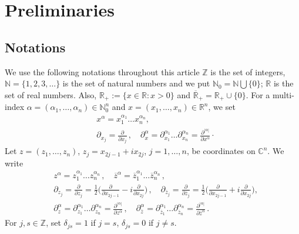 \documentclass[12pt]{amsart}
\theoremstyle{definition}
\theoremstyle{named}
\numberwithin{equation}{subsection}
\newcommand{\ol}{\overline}
\newcommand{\R}{\mathbb{R}}
\newcommand{\C}{\mathbb{C}}
\newcommand{\N}{\mathbb{N}}
\begin{document}
\section{Preliminaries}\label{s-gue241119yyd}
\subsection{Notations}
We use the following notations throughout this article 
$\mathbb{Z}$ is the set of integers, 
$\N=\{1,2,3,\ldots\}$ is the set of natural numbers and we 
put $\N_0=\N\bigcup\{0\}$; $\mathbb R$ is the set of
real numbers. Also, $\R_+:=\{x\in\R:x>0\}$ and 
$\overline{\mathbb R}_+=\R_+\cup\{0\}$.
For a multi-index $\alpha=(\alpha_1,\ldots,\alpha_n)\in\N^n_0$ 
and $x=(x_1,\ldots,x_n)\in\mathbb R^n$, we set
\begin{equation}
\begin{split}
&x^\alpha=x_1^{\alpha_1}\ldots x^{\alpha_n}_n,\\
& \partial_{x_j}=\frac{\partial}{\partial x_j}\,,\quad
\partial^\alpha_x=\partial^{\alpha_1}_{x_1}\ldots\partial^{\alpha_n}_{x_n}
=\frac{\partial^{|\alpha|}}{\partial x^\alpha}\cdot
\end{split}
\end{equation}
Let $z=(z_1,\ldots,z_n)$, $z_j=x_{2j-1}+ix_{2j}$, $j=1,\ldots,n$, 
be coordinates on $\C^n$. We write
\begin{equation}
\begin{split}
&z^\alpha=z_1^{\alpha_1}\ldots z^{\alpha_n}_n\,,
\quad\ol z^\alpha=\ol z_1^{\alpha_1}\ldots\ol z^{\alpha_n}_n\,,\\
&\partial_{z_j}=\frac{\partial}{\partial z_j}=
\frac{1}{2}\Big(\frac{\partial}{\partial x_{2j-1}}-
i\frac{\partial}{\partial x_{2j}}\Big)\,,
\quad\partial_{\ol z_j}=\frac{\partial}{\partial\ol z_j}
=\frac{1}{2}\Big(\frac{\partial}{\partial x_{2j-1}}+
i\frac{\partial}{\partial x_{2j}}\Big),\\
&\partial^\alpha_z=\partial^{\alpha_1}_{z_1}\ldots\partial^{\alpha_n}_{z_n}
=\frac{\partial^{|\alpha|}}{\partial z^\alpha}\,,\quad
\partial^\alpha_{\ol z}=\partial^{\alpha_1}_{\ol z_1}
\ldots\partial^{\alpha_n}_{\ol z_n}
=\frac{\partial^{|\alpha|}}{\partial\ol z^\alpha}\,.
\end{split}
\end{equation}
For $j, s\in\mathbb Z$, set $\delta_{js}=1$ if $j=s$, 
$\delta_{js}=0$ if $j\neq s$.  
\end{document}
